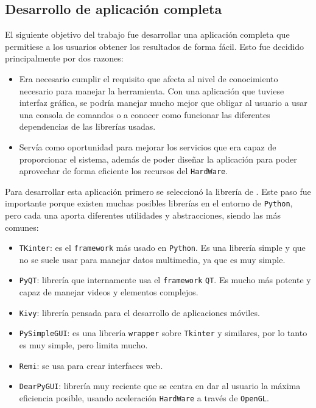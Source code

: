 \subsection{Desarrollo de aplicación completa}

El siguiente objetivo del trabajo fue desarrollar una aplicación completa que permitiese a los usuarios obtener los resultados de forma fácil. Esto fue decidido principalmente por dos razones:

\begin{itemize}
    \item Era necesario cumplir el requisito que afecta al nivel de conocimiento necesario para manejar la herramienta. Con una aplicación que tuviese interfaz gráfica, se podría manejar mucho mejor que 
    obligar al usuario a usar una consola de comandos o a conocer como funcionar las diferentes dependencias de las librerías usadas.
    \item Servía como oportunidad para mejorar los servicios que era capaz de proporcionar el sistema, además de poder diseñar la aplicación para poder aprovechar de forma eficiente los recursos del 
    \texttt{HardWare}.
\end{itemize}

Para desarrollar esta aplicación primero se seleccionó la librería de . Este paso fue importante porque existen muchas posibles librerías en el entorno de \texttt{Python}, pero cada una 
aporta diferentes utilidades y abstracciones, siendo las más comunes:
\begin{itemize}
    \item \texttt{TKinter}: es el \texttt{framework} más usado en \texttt{Python}. Es una librería simple y que no se suele usar para manejar datos multimedia, ya que es muy simple.
    \item \texttt{PyQT}: librería que internamente usa el \texttt{framework} \texttt{QT}. Es mucho más potente y capaz de manejar videos y elementos complejos.
    \item \texttt{Kivy}: librería pensada para el desarrollo de aplicaciones móviles.
    \item \texttt{PySimpleGUI}: es una librería \texttt{wrapper} sobre \texttt{Tkinter} y similares, por lo tanto es muy simple, pero limita mucho.
    \item \texttt{Remi}: se usa para crear interfaces web.
    \item \texttt{DearPyGUI}\cite{HoffstadtDearPyGuiDear}: librería muy reciente que se centra en dar al usuario la máxima eficiencia posible, usando aceleración \texttt{HardWare} a través de \texttt{OpenGL}.
\end{itemize}



